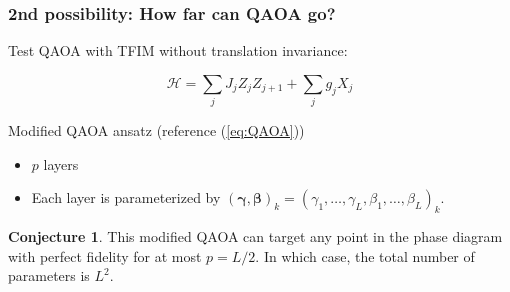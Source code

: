 \documentclass{beamer}
\theoremstyle{definition}
\newtheorem{conjecture}{Conjecture}[section]
\begin{document}

\begin{frame}
\frametitle{2nd possibility: How far can QAOA go?}

Test QAOA with TFIM without translation invariance:

\begin{equation}\label{eq:QAOAmod}
\mathcal{H} = \sum_{j}J_j Z_j Z_{j+1} + \sum_j g_j  X_j
\end{equation}


Modified QAOA ansatz (reference (\ref{eq:QAOA}))
\begin{itemize}
	\item $p$ layers
	\item Each layer is parameterized by $(\bm\gamma,\bm\beta)_k = (\gamma_{1},\dots,\gamma_{L},\beta_{1},\dots,\beta_{L} )_k$.
\end{itemize}


\begin{conjecture}
	This modified QAOA can target any point in the phase diagram with perfect fidelity for at most $p = L/2$. In which case, the total number of parameters is $L^2$.  
\end{conjecture}




\end{frame}


\end{document}
